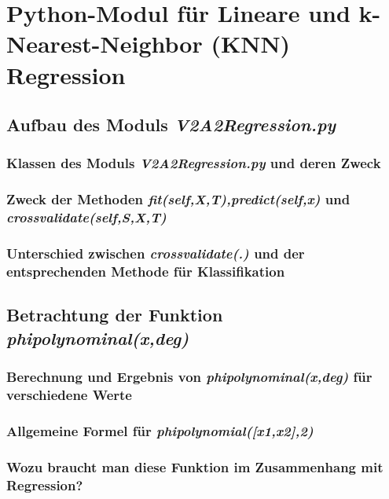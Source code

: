 \section{Python-Modul für Lineare und k-Nearest-Neighbor (KNN) Regression}


\subsection{
    Aufbau des Moduls \textit{V2A2\textunderscore Regression.py}
}

\subsubsection{ Klassen des Moduls \textit{V2A2\textunderscore Regression.py} und deren Zweck}

\subsubsection{ Zweck der Methoden \textit{fit(self,X,T),predict(self,x)} und \textit{crossvalidate(self,S,X,T)}}

\subsubsection{ Unterschied  zwischen \textit{crossvalidate(.)} und der entsprechenden Methode für Klassifikation}

\subsection{
    Betrachtung der Funktion \textit{phi\textunderscore polynominal(x,deg)}
}

\subsubsection{ Berechnung und Ergebnis von \textit{phi\textunderscore polynominal(x,deg)} für verschiedene Werte}

\subsubsection{ Allgemeine Formel für \textit{phi\textunderscore polynomial([x1,x2],2)} }

\subsubsection{ Wozu braucht man diese Funktion im Zusammenhang mit Regression? }

